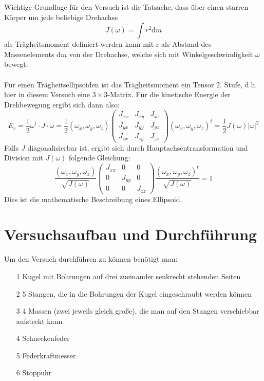 \documentclass[fontsize=12pt]{scrartcl}
\begin{document}
Wichtige Grundlage für den Versuch ist die Tatsache, dass über einen starren Körper um jede beliebige Drehachse
\begin{equation*}
J(\omega)=\int r^2 \text{d}m
\end{equation*}
als Trägheitsmoment definiert werden kann mit r als Abstand des Massenelements d$m$ von der Drehachse, welche sich mit Winkelgeschwindigkeit $\omega$ bewegt. \\
~\\
Für einen Trägheitsellipsoiden ist das Trägheitsmoment ein Tensor 2. Stufe, d.h. hier in diesem Versuch eine $3\times 3$-Matrix. Für die kinetische Energie der Drehbewegung ergibt sich dann also:
\begin{equation*}
E_r=\frac{1}{2} \omega^t \cdot J \cdot \omega = \frac{1}{2} (\omega_x,\omega_y,\omega_z) \left(\begin{array}{ccc}
J_{xx} & J_{xy} & J_{xz} \\ 
J_{yx} & J_{yy} & J_{yz} \\ 
J_{zx} & J_{zy} & J_{zz}
\end{array}\right)  (\omega_x,\omega_y,\omega_z)^t = \frac{1}{2} J(\omega) |\omega|^2
\end{equation*}
Falls $J$ diagonalisierbar ist, ergibt sich durch Hauptachsentransformation und Division mit $J(\omega)$ folgende Gleichung:
\begin{equation*}
\frac{(\omega_x,\omega_y,\omega_z)}{\sqrt{J(\omega)}} \left(\begin{array}{ccc}
J_{xx} & 0 & 0 \\ 
0 & J_{yy} & 0 \\ 
0 & 0 & J_{zz}
\end{array}\right) \frac{ (\omega_x,\omega_y,\omega_z)^t }{\sqrt{J(\omega)}} =1
\end{equation*}
Dies ist die mathematische Beschreibung eines Ellipsoid.
\newpage

\section{Versuchsaufbau und Durchführung}

Um den Versuch durchführen zu können benötigt man:
\begin{itemize}
\item[1] Kugel mit Bohrungen auf drei zueinander senkrecht stehenden Seiten
\item[2] 5 Stangen, die in die Bohrungen der Kugel eingeschraubt werden können
\item[3] 4 Massen (zwei jeweils gleich große), die man auf den Stangen verschiebbar aufsteckt kann
\item[4] Schneckenfeder
\item[5] Federkraftmesser
\item[6] Stoppuhr

\end{itemize}
\end{document}
